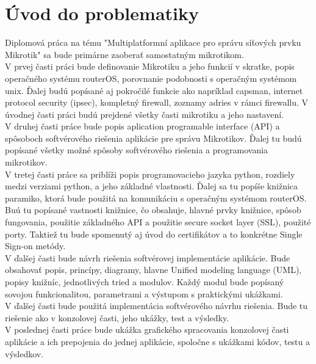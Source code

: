 \chapter{Úvod do problematiky}
Diplomová práca na tému "Multiplatformní aplikace pro správu síťových prvku Mikrotik" sa bude primárne zaoberať samostatným mikrotikom.\\
V prvej časti práci bude definovanie Mikrotiku a jeho funkcií v skratke, popis operačného systému routerOS, porovnanie podobnosti s operačným systémom unix. Ďalej budú popísané aj pokročilé funkcie ako napríklad capsman, internet protocol security (ipsec), kompletný firewall, zoznamy adries v rámci firewallu. V úvodnej časti práci budú prejdené všetky časti mikrotiku a jeho nastavení.\\
V druhej časti práce bude popis aplication programable interface (API) a spôsoboch softvérového riešenia aplikácie pre správu Mikrotikov. Ďalej tu budú popísané všetky možné spôsoby softvérového riešenia a 
programovania mikrotikov.\\
V tretej časti práce sa priblíži popis programovacieho jazyka python, rozdiely medzi verziami python, a jeho základné vlastnosti. Ďalej sa tu popíše knižnica paramiko, ktorá bude použitá na komunikáciu s operačným systémom routerOS. Buú tu popísané vastnosti knižnice, čo obsahuje, hlavné prvky knižnice, spôsob fungovania, použitie základného API a použitie secure socket layer (SSL), použité porty. Taktiež tu bude spomenutý aj úvod do certifikátov a to konkrétne Single Sign-on metódy. \\
V ďalšej časti bude návrh riešenia softvérovej implementácie aplikácie. Bude obsahovať popis, princípy, diagramy, hlavne Unified modeling language (UML), popisy knižníc, jednotlivých tried a modulov. Každý modul bude popísaný sovojou funkcionalitou, parametrami a výstupom s praktickými ukážkami.\\
V ďalšej časti bude použitá implementácia softvérového návrhu riešenia. Bude tu riešenie ako v konzolovej časti, jeho ukážky, test a výsledky. \\
V poslednej časti práce bude ukážka grafického spracovania konzolovej časti aplikácie a ich prepojenia do jednej aplikácie, spoločne s ukážkami kódov, testu  a výsledkov.
